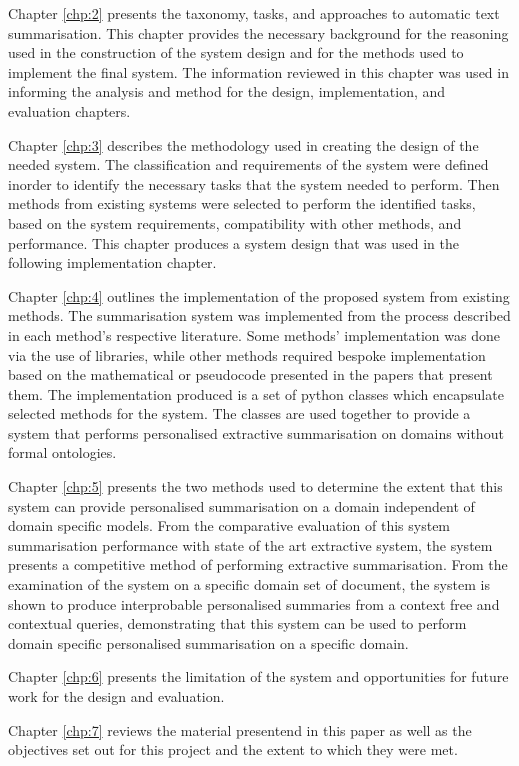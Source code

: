 Chapter \ref{chp:2} presents the taxonomy, tasks, and approaches to automatic text summarisation. This chapter provides the necessary background for the reasoning used in the construction of the system design and for the methods used to implement the final system. The information reviewed in this chapter was used in informing the analysis and method for the design, implementation, and evaluation chapters.

Chapter \ref{chp:3} describes the methodology used in creating the design of the needed system. The classification and requirements of the system were defined inorder to identify the necessary tasks that the system needed to perform. Then methods from existing systems were selected to perform the identified tasks, based on the system requirements, compatibility with other methods, and performance. This chapter produces a system design that was used in the following implementation chapter.

Chapter \ref{chp:4} outlines the implementation of the proposed system from existing methods. The summarisation system was implemented from the process described in each method's respective literature. Some methods’ implementation was done via the use of libraries, while other methods required bespoke implementation based on the mathematical or pseudocode presented in the papers that present them. The implementation produced is a set of python classes which encapsulate selected methods for the system. The classes are used together to provide a system that performs personalised extractive summarisation  on domains without formal ontologies.

Chapter \ref{chp:5} presents the two methods used to determine the extent that this system can provide personalised summarisation on a domain independent of domain specific models. From the comparative evaluation of this system summarisation performance with state of the art extractive system, the system presents a competitive method of performing extractive summarisation. From the examination of the system on a specific domain set of document, the system is shown to produce interprobable personalised summaries from a context free and contextual queries, demonstrating that this system can be used to perform domain specific personalised summarisation on a specific domain.

Chapter \ref{chp:6} presents the limitation of the system and opportunities for future work for the design and evaluation.

Chapter \ref{chp:7} reviews the material presentend in this paper as well as the objectives set out for this project and the extent to which they were met. 

\RaggedRight